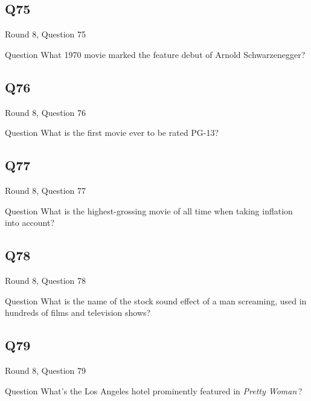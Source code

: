 \documentclass[11pt]{beamer}
\begin{document}
\subsection*{Q75}
\begin{frame}[t]{Round 8, Question 75}
\vspace{2em}
\begin{block}{Question}
What 1970 movie marked the feature debut of Arnold Schwarzenegger?
\end{block}
\end{frame}
    

\subsection*{Q76}
\begin{frame}[t]{Round 8, Question 76}
\vspace{2em}
\begin{block}{Question}
What is the first movie ever to be rated PG-13?
\end{block}
\end{frame}
    

\subsection*{Q77}
\begin{frame}[t]{Round 8, Question 77}
\vspace{2em}
\begin{block}{Question}
What is the highest-grossing movie of all time when taking inflation into account?
\end{block}
\end{frame}
    

\subsection*{Q78}
\begin{frame}[t]{Round 8, Question 78}
\vspace{2em}
\begin{block}{Question}
What is the name of the stock sound effect of a man screaming, used in hundreds of films and television shows?
\end{block}
\end{frame}
    

\subsection*{Q79}
\begin{frame}[t]{Round 8, Question 79}
\vspace{2em}
\begin{block}{Question}
What's the Los Angeles hotel prominently featured in \emph{Pretty Woman}\,?
\end{block}
\end{frame}
    
\end{document}
